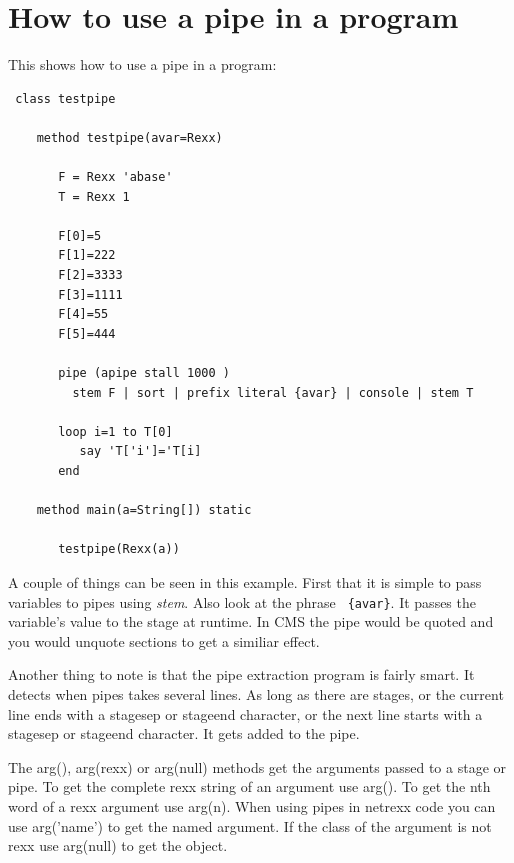   
\chapter{How to use a pipe in a \nr{} program}

This shows how to use a pipe in a \nr{} program:

\begin{lstlisting}
 class testpipe

    method testpipe(avar=Rexx)

       F = Rexx 'abase'
       T = Rexx 1

       F[0]=5
       F[1]=222
       F[2]=3333
       F[3]=1111
       F[4]=55
       F[5]=444

       pipe (apipe stall 1000 )
         stem F | sort | prefix literal {avar} | console | stem T

       loop i=1 to T[0]
          say 'T['i']='T[i]
       end

    method main(a=String[]) static

       testpipe(Rexx(a))
\end{lstlisting}
 A couple of things can be seen in this example.  First that it is
 simple to pass \nr{} variables to pipes using \emph{stem}.  Also look
 at the phrase \texttt{ \{avar\}}. It passes the \nr{} variable's value to the stage at runtime.  In CMS the pipe would be quoted and you would unquote sections to get a similiar effect.

 Another thing to note is that the pipe extraction program is fairly smart. It detects when pipes takes several lines.  As long as there are stages, or the current line ends with a stagesep or stageend character, or the next line starts with a stagesep or stageend character.  It gets added to the pipe.

 The arg(), arg(rexx) or arg(null) methods get the arguments passed to
 a stage or pipe.  To get the complete rexx string of an argument use
 arg(). To get the nth word of a rexx argument use arg(n).  When using
 pipes in netrexx code you can use arg('name') to get the named
 argument. If the class of the argument is not rexx use arg(null) to
 get the object.
 
